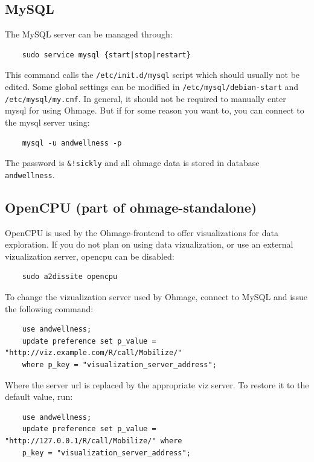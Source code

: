 \documentclass{scrartcl}
\begin{document}
\subsection{MySQL}

The MySQL server can be managed through:

\begin{verbatim}
    sudo service mysql {start|stop|restart}
\end{verbatim}

\noindent This command calls the \texttt{/etc/init.d/mysql} script which should
usually not be edited. Some global settings can be modified in
\texttt{/etc/mysql/debian-start} and \texttt{/etc/mysql/my.cnf}. In general, it
should not be required to manually enter mysql for using Ohmage. But if for some
reason you want to, you can connect to the mysql server using:

\begin{verbatim}
    mysql -u andwellness -p
\end{verbatim}
The password is \texttt{\&!sickly} and all ohmage data is stored in database
\texttt{andwellness}.

\subsection{OpenCPU (part of ohmage-standalone)}

OpenCPU is used by the Ohmage-frontend to offer visualizations for data
exploration. If you do not plan on using data vizualization, or use an
external vizualization server, opencpu can be disabled:

\begin{verbatim}
    sudo a2dissite opencpu
\end{verbatim}
To change the vizualization server used by Ohmage, connect to MySQL and issue
the following command:

\begin{verbatim}
    use andwellness;
    update preference set p_value = "http://viz.example.com/R/call/Mobilize/"
    where p_key = "visualization_server_address";
\end{verbatim}
Where the server url is replaced by the appropriate viz server. To
restore it to the default value, run:

\begin{verbatim}
    use andwellness;
    update preference set p_value = "http://127.0.0.1/R/call/Mobilize/" where
    p_key = "visualization_server_address";
\end{verbatim}
\end{document}
